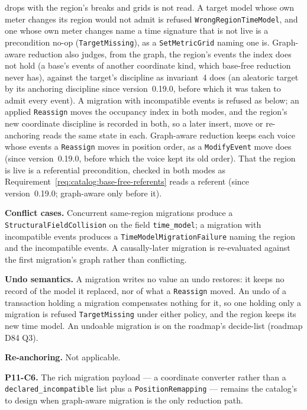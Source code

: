 \documentclass[11pt,letterpaper]{report}
\begin{document}
drops with the region's breaks and grids is not read. A target model whose own
meter changes its region would not admit is refused
\texttt{WrongRegionTimeModel}, and one whose own meter changes name a time
signature that is not live is a precondition no-op (\texttt{TargetMissing}),
as a \texttt{SetMetricGrid} naming one is. Graph-aware
reduction also judges, from the graph, the region's events the index does not
hold (a base's events of another coordinate kind, which base-free reduction
never has), against the target's discipline as invariant~4 does (an aleatoric
target by its anchoring discipline since version~0.19.0, before which it was
taken to admit every event). A migration with incompatible events is refused as below; an
applied \texttt{Reassign} moves the occupancy index in both modes, and the
region's new coordinate discipline is recorded in both, so a later insert, move
or re-anchoring reads the same state in each. Graph-aware reduction keeps each
voice whose events a \texttt{Reassign} moves in position order, as a
\texttt{ModifyEvent} move does (since version~0.19.0, before which the voice
kept its old order). That the region is live is a
referential precondition, checked in both modes as
Requirement~\ref{req:catalog:base-free-referents} reads a referent (since
version~0.19.0; graph-aware only before it).

\textbf{Conflict cases.} Concurrent same-region migrations produce a
\texttt{StructuralFieldCollision} on the field \texttt{time\_model}; a migration
with incompatible events produces a \texttt{TimeModelMigrationFailure} naming the
region and the incompatible events. A causally-later migration is re-evaluated
against the first migration's graph rather than conflicting.

\textbf{Undo semantics.} A migration writes no value an undo restores: it keeps
no record of the model it replaced, nor of what a \texttt{Reassign} moved. An
undo of a transaction holding a migration compensates nothing for it, so one
holding only a migration is refused \texttt{TargetMissing} under either policy,
and the region keeps its new time model. An undoable migration is on the
roadmap's decide-list (roadmap D84 Q3).

\textbf{Re-anchoring.} Not applicable.

\begin{openquestion}
\textbf{P11-C6.} The rich migration payload --- a coordinate converter rather than a
\texttt{declared\_incompatible} list plus a \texttt{PositionRemapping} --- remains
the catalog's to design when graph-aware migration is the only reduction path.
\end{openquestion}
\end{document}
